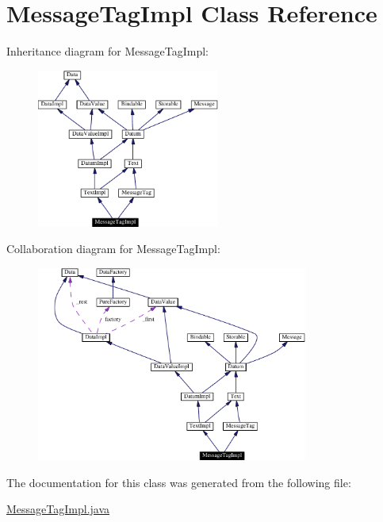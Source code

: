 \hypertarget{classMessageTagImpl}{
\section{Message\-Tag\-Impl  Class Reference}
\label{classMessageTagImpl}
}
Inheritance diagram for Message\-Tag\-Impl:\begin{figure}[H]
\begin{center}
\leavevmode
\includegraphics[width=170pt]{classMessageTagImpl__inherit__graph}
\end{center}
\end{figure}
Collaboration diagram for Message\-Tag\-Impl:\begin{figure}[H]
\begin{center}
\leavevmode
\includegraphics[width=253pt]{classMessageTagImpl__coll__graph}
\end{center}
\end{figure}


The documentation for this class was generated from the following file:\begin{CompactItemize}
\item 
\hyperlink{MessageTagImpl_8java-source}{Message\-Tag\-Impl.java}\end{CompactItemize}
